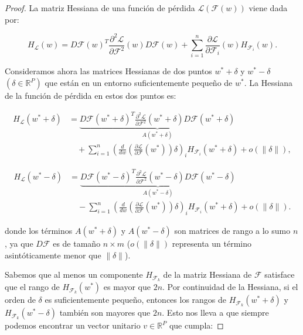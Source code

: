 \begin{proof}
    La matriz Hessiana de una función de pérdida $\mathcal{L}(\mathcal{F}(w))$ viene dada por:

    \[
        H_{\mathcal{L}}(w) = D\mathcal{F}(w)^T \frac{\partial^2 \mathcal{L}}{\partial \mathcal{F}^2}(w) D\mathcal{F}(w) + \sum_{i=1}^{n} \frac{\partial \mathcal{L}}{\partial \mathcal{F}_i}(w) H_{\mathcal{F}_i}(w).
    \]

    Consideramos ahora las matrices Hessianas de dos puntos $w^* + \delta $ y $w^* - \delta $ $(\delta \in \mathbb{R}^{P})$ que están en un entorno suficientemente pequeño de $w^*$. La Hessiana de la función de pérdida en estos dos puntos es:

    \begin{equation}\label{eq:non-convexity1}
        \begin{aligned}
            H_{\mathcal{L}}( w^* + \delta) &=  
            \underbrace{D\mathcal{F}( w^* + \delta)^T \frac{\partial^2 \mathcal{L}}{\partial \mathcal{F}^2}( w^* + \delta) D\mathcal{F}( w^* + \delta)}_{A( w^* + \delta)} \\
            &\quad + \sum_{i=1}^{n} \left( \frac{d}{d w} \left( \frac{\partial \mathcal{L}}{\partial \mathcal{F}}( w^*) \right) \delta \right)_i H_{\mathcal{F}_i}( w^* + \delta) + o(\|\delta\|),
        \end{aligned}
    \end{equation}
        
    \begin{align}
        H_{\mathcal{L}}( w^* - \delta) &=  
        \underbrace{D\mathcal{F}( w^* - \delta)^T \frac{\partial^2 \mathcal{L}}{\partial \mathcal{F}^2}( w^* - \delta) D\mathcal{F}( w^* - \delta)}_{A( w^* - \delta)} \nonumber \\
        &\quad - \sum_{i=1}^{n} \left( \frac{d}{d w} \left( \frac{\partial \mathcal{L}}{\partial \mathcal{F}}( w^*) \right) \delta \right)_i H_{\mathcal{F}_i}( w^* + \delta) + o(\|\delta\|).
    \end{align}
        

    donde los términos $ A( w^* + \delta) $ y $ A( w^* - \delta) $ son matrices de rango a lo sumo $ n $, ya que $ D\mathcal{F} $ es de tamaño $ n \times m $ ($o(\|\delta\|)$ representa un término asintóticamente menor que $\| \delta \|$).\newline

    Sabemos que al menos un componente $ H_{\mathcal{F}_k} $ de la matriz Hessiana de $ \mathcal{F} $ satisface que el rango de $ H_{\mathcal{F}_k}( w^*) $ es mayor que $ 2n $. Por continuidad de la Hessiana, si el orden de $ \delta $ es suficientemente pequeño, entonces los rangos de $ H_{\mathcal{F}_k}( w^* + \delta) $ y $ H_{\mathcal{F}_k}( w^* - \delta) $ también son mayores que $ 2n $. Esto nos lleva a que siempre podemos encontrar un vector unitario $v \in \mathbb{R}^P $ que cumpla:


\end{proof}
